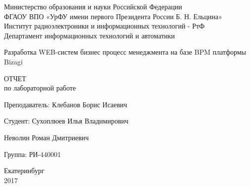 \begin{center}
    Министерство образования и науки Российской Федерации\\
    ФГАОУ ВПО  «УрФУ имени первого Президента России Б. Н. Ельцина»\\
    Институт радиоэлектроники и информационных технологий - РтФ\\
    Департамент информационных технологий и автоматики
    \par
    \vspace{3.5cm}
    \Large{
      Разработка WEB-систем бизнес процесс менеджмента
      на базе BPM платформы Bizagi

      \par
      \vspace{0.5cm}

      ОТЧЕТ\\
      по лабораторной работе
    }

    \vspace{3.5cm}
    {
      Преподаватель: \hfill Клебанов Борис Исаевич
    }
    \par
    {
      Студент: \hfill Сухоплюев Илья Владимирович
    }
    \par
    {
              \hfill Неволин Роман Дмитриевич
    }
    \par
    {
      Группа: \hfill РИ-440001
    }

    \par
    \vspace{3cm}
    Екатеринбург\\
    2017
\end{center}
